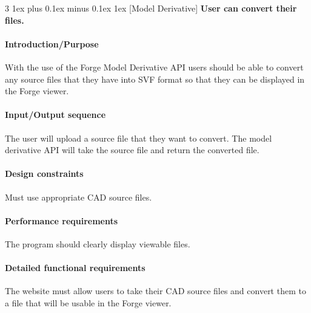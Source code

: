 \documentclass[letterpaper, 10pt, draftclsnofoot, compsoc, onecolumn]{IEEEtran}
\makeatletter
\def\subsubsection{\@startsection{subsubsection}%
                                 {3}%
                                 {\z@}%
                                 {1ex plus 0.1ex minus 0.1ex}%
                                 {1ex}%
                                 {\normalfont\normalsize}}%
\makeatother
\begin{document}

\subsubsection[{Model Derivative}]{\rmfamily\bfseries\color{black} \rmfamily\bfseries\color{black}  
	User can convert their files.
}


\paragraph[Introduction/Purpose of this
feature]{\rmfamily\bfseries\color{black}
Introduction/Purpose }
	With the use of the Forge Model Derivative API users should be able to convert any source files that they have into SVF format
	so that they can be displayed in the Forge viewer.

\paragraph[Input/Output sequence]{\rmfamily\bfseries\color{black}
Input/Output sequence }
	The user will upload a source file that they want to convert. The model derivative API will take the source file and return the 
	converted file.

\paragraph[Design constraints]{\rmfamily\bfseries\color{black} Design
constraints }
	Must use appropriate CAD source files. 

\paragraph[Performance requirements]{\rmfamily\bfseries\color{black}
Performance requirements }
	The program should clearly display viewable files.

\paragraph[Detailed functional requirements]{\rmfamily\bfseries\color{black}
Detailed functional requirements }
	The website must allow users to take their CAD source files and convert them to a file that will be usable in the
	Forge viewer.    

\end{document}
